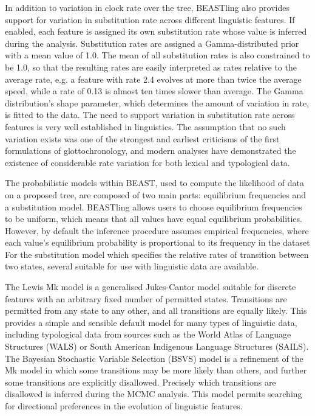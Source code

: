 \documentclass[twocolumn,10pt]{scrartcl}
\begin{document}
In addition to variation in clock rate over the tree, BEASTling also provides support for variation in substitution rate across different linguistic features.  If enabled, each feature is assigned its own substitution rate whose value is inferred during the analysis.  Substitution rates are assigned a Gamma-distributed prior with a mean value of 1.0.  The mean of all substitution rates is also constrained to be 1.0, so that the resulting rates are easily interpreted as rates relative to the average rate, e.g. a feature with rate 2.4 evolves at more than twice the average speed, while a rate of 0.13 is almost ten times slower than average.  The Gamma distribution's shape parameter, which determines the amount of variation in rate, is fitted to the data.  The need to support variation in substitution rate across features is very well established in linguistics.  The assumption that no such variation exists was one of the strongest and earliest criticisms of the first formulations of glottochronology, and modern analyses have demonstrated the existence of considerable rate variation for both lexical\cite{Pagel2007} and typological\cite{Greenhill2010,Dediu2011} data.

The probabilistic models within BEAST, used to compute the likelihood of data on a proposed tree, are composed of two main parts: equilibrium frequencies and a substitution model.  BEASTling allows users to choose equilibrium frequencies to be uniform, which means that all values have equal equilibrium probabilities. However, by default the inference procedure assumes empirical frequencies, where each value's equilibrium probability is proportional to its frequency in the dataset  For the substitution model which specifies the relative rates of transition between two states, several suitable for use with linguistic data are available.

The Lewis Mk model\cite{Lewis2001} is a generalised Jukes-Cantor model suitable for discrete features with an arbitrary fixed number of permitted states.  Transitions are permitted from any state to any other, and all transitions are equally likely.  This provides a simple and sensible default model for many types of linguistic data, including typological data from sources such as the World Atlas of Language Structures\cite{Dryer2013} (WALS) or South American Indigenous Language Structures\cite{Muysken2014} (SAILS).  The Bayesian Stochastic Variable Selection (BSVS) model is a refinement of the Mk model in which some transitions may be more likely than others, and further some transitions are explicitly disallowed.  Precisely which transitions are disallowed is inferred during the MCMC analysis.  This model permits searching for directional preferences in the evolution of linguistic features.
\end{document}
